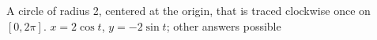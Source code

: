 {A circle of radius 2, centered at the origin, that is traced clockwise once on $[0,2\pi]$.
}
{$x=2\cos t$, $y=-2\sin t$; other answers possible
}